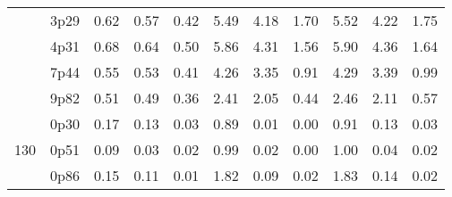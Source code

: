 \documentclass[12pt,A4paper]{article}
\begin{document}
\begin{table}[]
\begin{tabular}{lllllllllll}
\multicolumn{1}{|l|}{} & \multicolumn{1}{l|}{3p29} & \multicolumn{1}{c|}{0.62}        & \multicolumn{1}{c|}{0.57}         & \multicolumn{1}{c|}{0.42}        & \multicolumn{1}{c|}{5.49}         & \multicolumn{1}{c|}{4.18}        & \multicolumn{1}{c|}{1.70}        & \multicolumn{1}{c|}{5.52}        & \multicolumn{1}{c|}{4.22}        & \multicolumn{1}{c|}{1.75}         \\ \cline{2-11}
\multicolumn{1}{|l|}{} & \multicolumn{1}{l|}{4p31} & \multicolumn{1}{c|}{0.68}        & \multicolumn{1}{c|}{0.64}         & \multicolumn{1}{c|}{0.50}        & \multicolumn{1}{c|}{5.86}         & \multicolumn{1}{c|}{4.31}        & \multicolumn{1}{c|}{1.56}        & \multicolumn{1}{c|}{5.90}        & \multicolumn{1}{c|}{4.36}        & \multicolumn{1}{c|}{1.64}         \\ \cline{2-11}
\multicolumn{1}{|l|}{} & \multicolumn{1}{l|}{7p44} & \multicolumn{1}{c|}{0.55}        & \multicolumn{1}{c|}{0.53}         & \multicolumn{1}{c|}{0.41}        & \multicolumn{1}{c|}{4.26}         & \multicolumn{1}{c|}{3.35}        & \multicolumn{1}{c|}{0.91}        & \multicolumn{1}{c|}{4.29}        & \multicolumn{1}{c|}{3.39}        & \multicolumn{1}{c|}{0.99}         \\ \cline{2-11}
\multicolumn{1}{|l|}{} & \multicolumn{1}{l|}{9p82} & \multicolumn{1}{c|}{0.51}        & \multicolumn{1}{c|}{0.49}         & \multicolumn{1}{c|}{0.36}        & \multicolumn{1}{c|}{2.41}         & \multicolumn{1}{c|}{2.05}        & \multicolumn{1}{c|}{0.44}        & \multicolumn{1}{c|}{2.46}        & \multicolumn{1}{c|}{2.11}        & \multicolumn{1}{c|}{0.57}         \\ \hline
\multicolumn{1}{|l|}{\multirow{11}{*}{130}} & \multicolumn{1}{l|}{0p30} & \multicolumn{1}{c|}{0.17}        & \multicolumn{1}{c|}{0.13}         & \multicolumn{1}{c|}{0.03}        & \multicolumn{1}{c|}{0.89}         & \multicolumn{1}{c|}{0.01}        & \multicolumn{1}{c|}{0.00}         & \multicolumn{1}{c|}{0.91}         & \multicolumn{1}{c|}{0.13}         & \multicolumn{1}{c|}{0.03}         \\ \cline{2-11} 
\multicolumn{1}{|l|}{} & \multicolumn{1}{l|}{0p51} & \multicolumn{1}{c|}{0.09}        & \multicolumn{1}{c|}{0.03}         & \multicolumn{1}{c|}{0.02}        & \multicolumn{1}{c|}{0.99}         & \multicolumn{1}{c|}{0.02}        & \multicolumn{1}{c|}{0.00}        & \multicolumn{1}{c|}{1.00}        & \multicolumn{1}{c|}{0.04}        & \multicolumn{1}{c|}{0.02}         \\ \cline{2-11}
\multicolumn{1}{|l|}{} & \multicolumn{1}{l|}{0p86} & \multicolumn{1}{c|}{0.15}        & \multicolumn{1}{c|}{0.11}         & \multicolumn{1}{c|}{0.01}        & \multicolumn{1}{c|}{1.82}         & \multicolumn{1}{c|}{0.09}        & \multicolumn{1}{c|}{0.02}        & \multicolumn{1}{c|}{1.83}        & \multicolumn{1}{c|}{0.14}        & \multicolumn{1}{c|}{0.02}         \\ \cline{2-11}

\end{tabular}
\end{table}
\end{document}
